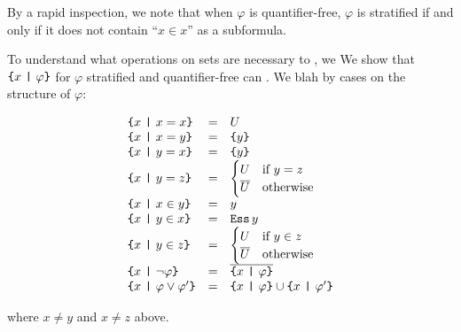\documentclass[sigplan,10pt,anonymous,review]{acmart}\settopmatter{printfolios=true,printccs=false,printacmref=false}
\begin{document}


By a rapid inspection, we note that when $\varphi$ is quantifier-free, $\varphi$ is stratified if and only if it does not contain ``$x \in x$'' as a subformula.

To understand what operations on sets are necessary to , we 
We show that $\Compr x \varphi$ for $\varphi$ stratified and quantifier-free can . We blah by cases on the structure of $\varphi$:

\[\begin{array}{lcll}
  \Compr x {x = x} & = & \Universe \\
  \Compr x {x = y} & = & \Sing y \\
  \Compr x {y = x} & = & \Sing y \\
  \Compr x {y = z} & = &
    \begin{cases}
      \Universe & \text{if } y = z\\
      \Complement \Universe & \text{otherwise}
    \end{cases}\\
  \Compr x {x \in y} & = & y \\
  \Compr x {y \in x} & = & \Essence y \\
  \Compr x {y \in z} & = &
    \begin{cases}
      \Universe & \text{if } y \in z\\
      \Complement \Universe & \text{otherwise}
    \end{cases}\\
  \Compr x {\neg\varphi} & = & \Complement {\Compr x \varphi} \\
  \Compr x {\varphi \lor \varphi'} & = & \Union {\Compr x \varphi} {\Compr x {\varphi'}} \\
\end{array}\]

where $x\neq y$ and $x \neq z$ above.
\end{document}
